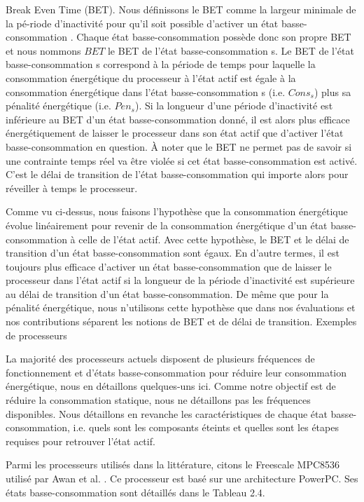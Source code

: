 Break Even Time (BET). Nous définissons le BET comme la largeur
minimale de la pé-riode d’inactivité pour qu’il soit possible
d’activer un état basse-consommation \cite{AP11, CG06, DA08a}.  Chaque
état basse-consommation possède donc son propre BET et nous nommons
$BET$ le BET de l’état basse-consommation s.  Le BET de l’état
basse-consommation s correspond à la période de temps pour laquelle la
consommation énergétique du processeur à l’état actif est égale à la
consommation énergétique dans l’état basse-consommation s
(i.e. $Cons_s$) plus sa pénalité énergétique (i.e. $Pen_s$). Si la
longueur d’une période d’inactivité est inférieure au BET d’un état
basse-consommation donné, il est alors plus efficace énergétiquement de
laisser le processeur dans son état actif que d’activer l’état
basse-consommation en question. À noter que le BET ne permet pas de
savoir si une contrainte temps réel va être violée si cet état
basse-consommation est activé. C’est le délai de transition de l’état
basse-consommation qui importe alors pour réveiller à temps le
processeur.

Comme vu ci-dessus, nous faisons l’hypothèse que la consommation
énergétique évolue linéairement pour revenir de la consommation
énergétique d’un état basse-consommation à celle de l’état actif.
Avec cette hypothèse, le BET et le délai de transition d’un état
basse-consommation sont égaux.  En d’autre termes, il est toujours
plus efficace d’activer un état basse-consommation que de laisser le
processeur dans l’état actif si la longueur de la période d’inactivité
est supérieure au délai de transition d’un état basse-consommation. De
même que pour la pénalité énergétique, nous n’utilisons cette
hypothèse que dans nos évaluations et nos contributions séparent les
notions de BET et de délai de transition.  Exemples de processeurs

La majorité des processeurs actuels disposent de plusieurs fréquences
de fonctionnement et d’états basse-consommation pour réduire leur
consommation énergétique, nous en détaillons quelques-uns ici. Comme
notre objectif est de réduire la consommation statique, nous ne
détaillons pas les fréquences disponibles. Nous détaillons en revanche
les caractéristiques de chaque état basse-consommation, i.e. quels
sont les composants éteints et quelles sont les étapes requises pour
retrouver l’état actif.

Parmi les processeurs utilisés dans la littérature, citons le
Freescale MPC8536 \cite{MPC} utilisé par Awan et al. \cite{AP11, AP13,
  AYP13}. Ce processeur est basé sur une architecture PowerPC. Ses
états basse-consommation sont détaillés dans le Tableau 2.4.
